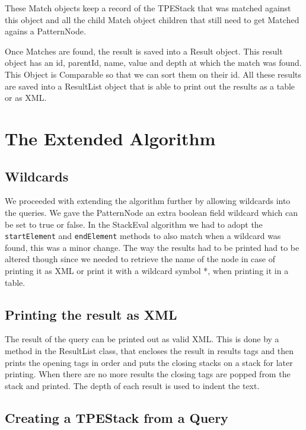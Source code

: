 \documentclass[11pt]{article}
\begin{document}
These Match objects keep a record of the TPEStack that was matched against this object and all the child Match object children that still need to get Matched agains a PatternNode. 

Once Matches are found, the result is saved into a Result object. This result object has an id, parentId, name, value and depth at which the match was found. This Object is Comparable so that we can sort them on their id. All these results are saved into a ResultList object that is able to print out the results as a table or as XML. 

%

\newpage
\section{The Extended Algorithm}
\subsection{Wildcards}
We proceeded with extending the algorithm further by allowing wildcards into the queries. We gave the PatternNode an extra boolean field wildcard which can be set to true or false. In the StackEval algorithm we had to adopt the \lstinline{startElement} and \lstinline{endElement} methods to also match when a wildcard was found, this was a minor change. The way the results had to be printed had to be altered though since we needed to retrieve the name of the node in case of printing it as XML or print it with a wildcard symbol *, when printing it in a table.

\subsection{Printing the result as XML}
The result of the query can be printed out as valid XML. This is done by a method in the ResultList class, that encloses the result in results tags and then prints the opening tags in order and puts the closing stacks on a stack for later printing. When there are no more results the closing tags are popped from the stack and printed. The depth of each result is used to indent the text.

\subsection{Creating a TPEStack from a Query}
\end{document}
